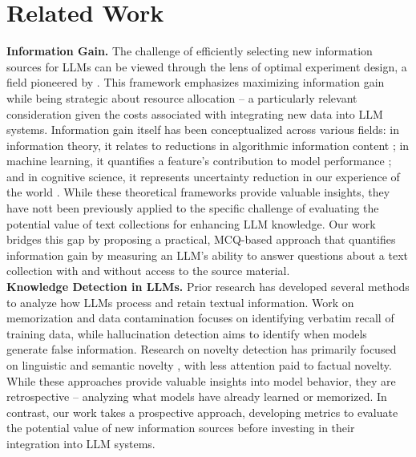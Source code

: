 \section{Related Work}
\noindent\textbf{Information Gain. }
The challenge of efficiently selecting new information sources for LLMs can be viewed through the lens of optimal experiment design, a field pioneered by \citet{fedorov1972theory}. This framework emphasizes maximizing information gain while being strategic about resource allocation -- a particularly relevant consideration given the costs associated with integrating new data into LLM systems. Information gain itself has been conceptualized across various fields: in information theory, it relates to reductions in algorithmic information content \cite{cover1989kolmogorov}; in machine learning, it quantifies a feature's contribution to model performance \cite{ODHIAMBOOMUYA2021114765}; and in cognitive science, it represents uncertainty reduction in our experience of the world \cite{damiano2021visual}. While these theoretical frameworks provide valuable insights, they have nott been previously applied to the specific challenge of evaluating the potential value of text collections for enhancing LLM knowledge. Our work bridges this gap by proposing a practical, MCQ-based approach that quantifies information gain by measuring an LLM's ability to answer questions about a text collection with and without access to the source material.\\

\noindent\textbf{Knowledge Detection in LLMs. }
Prior research has developed several methods to analyze how LLMs process and retain textual information. Work on memorization \cite{hartmann2023sokmemorizationgeneralpurposelarge,shi2024detectingpretrainingdatalarge} and data contamination \cite{yax2024assessingcontaminationlargelanguage,golchin2024datacontaminationquiztool} focuses on identifying verbatim recall of training data, while hallucination detection \cite{farquhar_detecting_hallucinations_llms_semantic_entropy} aims to identify when models generate false information. Research on novelty detection has primarily focused on linguistic and semantic novelty \cite{language_novelty_1,semantic_linguistic_novelty_focus_paper}, with less attention paid to factual novelty. While these approaches provide valuable insights into model behavior, they are retrospective -- analyzing what models have already learned or memorized. In contrast, our work takes a prospective approach, developing metrics to evaluate the potential value of new information sources before investing in their integration into LLM systems.